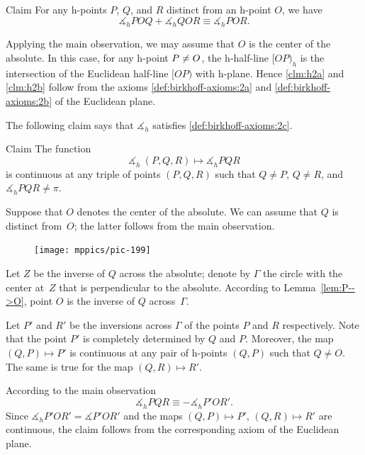 \begin{thm}{Claim}\label{clm:h2b}
For any h-points $P$, $Q$, and $R$ distinct from an h-point $O$, we have
$$\measuredangle_h P O Q+\measuredangle_h Q O R
\equiv\measuredangle_h P O R.$$

\end{thm}

Applying the main observation, 
we may assume that $O$ is the center of the absolute.
In this case, for any h-point $P\z\ne O$, the h-half-line
$[OP)_h$ is the intersection of the Euclidean half-line $[OP)$ with h-plane.
Hence \ref{clm:h2a} and \ref{clm:h2b} 
follow from the axioms \ref{def:birkhoff-axioms:2a} and \ref{def:birkhoff-axioms:2b} of the Euclidean plane.
\qeds

The following claim says that
$\measuredangle_h$ satisfies
 \ref{def:birkhoff-axioms:2c}.

\begin{thm}{Claim}\label{clm:h2c}
The function 
$$\measuredangle_h\:(P,Q,R)\mapsto\measuredangle_h P Q R$$
is continuous at any triple of points $(P,Q,R)$
such that $Q\ne P$, $Q\ne R$, and $\measuredangle_h P Q R\ne\pi$.
\end{thm}

Suppose that $O$ denotes the center of the absolute.
We can assume that $Q$ is distinct from~$O$;
the latter follows from the main observation.

\begin{figure}
\vskip-4mm
\centering
\texttt{[image: mppics/pic-199]}
\end{figure}

Let $Z$ be the inverse of $Q$ across the absolute;
denote by $\Gamma$ the circle with the center at~$Z$ that is perpendicular to the absolute.
According to Lemma~\ref{lem:P-->O},
point $O$ is the inverse of $Q$ across~$\Gamma$.

Let $P'$ and $R'$ be the inversions across $\Gamma$ of the points $P$ and $R$ respectively.
Note that the point $P'$ is completely determined by $Q$ and $P$.
Moreover, the map $(Q,P)\mapsto P'$ is continuous at any pair of h-points $(Q,P)$ such that $Q\ne O$.
The same is true for the map $(Q,R)\mapsto R'$.

According to the main observation 
$$\measuredangle_h P Q R\equiv -\measuredangle_h P' O R'.$$
Since $\measuredangle_h P' O R'=\measuredangle P' O R'$ and 
the maps $(Q,P)\mapsto P'$, $(Q,R)\mapsto R'$ are continuous,
the claim follows from the corresponding axiom of the Euclidean plane.
\qeds

